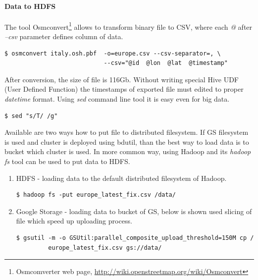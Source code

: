 \documentclass[a4paper,12pt,oneside]{report}
\begin{document}
\paragraph{Data to HDFS}
	 The tool Osmconvert\footnote{Osmcomverter web
	page, \url{http://wiki.openstreetmap.org/wiki/Osmconvert}} allows to transform
	binary file to CSV,  where each 	\textit{@} after \textit{--csv} parameter
	defines column of data.
        \newpage
	\begin{footnotesize}
		\begin{lstlisting}[style=python]
$ osmconvert italy.osh.pbf  -o=europe.csv --csv-separator=, \
                            --csv="@id  @lon  @lat  @timestamp"
		\end{lstlisting}
	\end{footnotesize}
	 After conversion, the size of file is 116Gb. Without writing special Hive
	UDF (User Defined Function) the timestamps of exported file must edited to proper
	\textit{datetime} format. Using \textit{sed} command line tool it is easy even
	for big data.
	\begin{footnotesize}
		\begin{lstlisting}[style=python]
$ sed "s/T/ /g"
		\end{lstlisting}
	\end{footnotesize}
	 	Available are two ways how to put file to distributed filesystem. If GS
	filesystem is used and cluster is deployed using bdutil, than the best way to
	load data is to bucket which cluster is used. 
	In more common way, using Hadoop and
	its \textit{hadoop fs} tool can be used to put data to HDFS.
\begin{enumerate}
\item HDFS  - loading data to the default distributed filesystem of Hadoop.
	\begin{footnotesize}
		\begin{lstlisting}[style=python]
$ hadoop fs -put europe_latest_fix.csv /data/
		\end{lstlisting}
	\end{footnotesize}
\item Google Storage - loading data to bucket of GS, below is shown used slicing of
file which speed up uploading process.
	\begin{footnotesize}
		\begin{lstlisting}[style=python]
$ gsutil -m -o GSUtil:parallel_composite_upload_threshold=150M cp /
		 europe_latest_fix.csv gs://data/
		\end{lstlisting}
	\end{footnotesize}
\end{enumerate}
\end{document}
